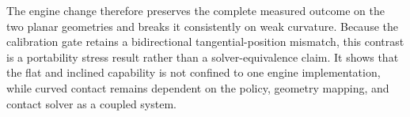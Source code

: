 

The engine change therefore preserves the complete measured outcome on the
two planar geometries and breaks it consistently on weak curvature. Because
the calibration gate retains a bidirectional tangential-position mismatch,
this contrast is a portability stress result rather than a solver-equivalence
claim. It shows that the flat and inclined capability is not confined to one
engine implementation, while curved contact remains dependent on the policy,
geometry mapping, and contact solver as a coupled system.
